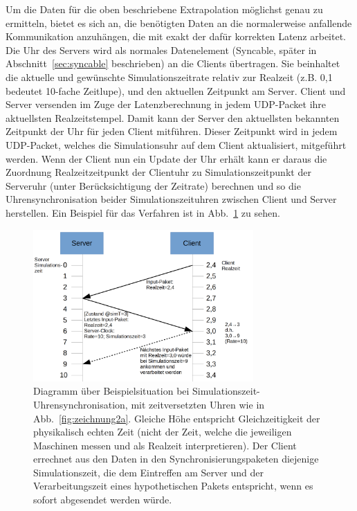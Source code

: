 Um die Daten für die oben beschriebene Extrapolation möglichst genau zu ermitteln, bietet es sich an, die benötigten Daten an die normalerweise anfallende Kommunikation anzuhängen, die mit exakt der dafür korrekten Latenz arbeitet. Die Uhr des Servers wird als normales Datenelement (Syncable, später in Abschnitt~\ref{sec:syncable} beschrieben) an die Clients übertragen. Sie beinhaltet die aktuelle und gewünschte Simulationszeitrate relativ zur Realzeit (z.B. 0,1 bedeutet 10-fache Zeitlupe), und den aktuellen Zeitpunkt am Server. 
Client und Server versenden im Zuge der Latenzberechnung in jedem UDP-Packet ihre aktuellsten Realzeitstempel. Damit kann der Server den aktuellsten bekannten Zeitpunkt der Uhr für jeden Client mitführen. 
Dieser Zeitpunkt wird in jedem UDP-Packet, welches die Simulationsuhr auf dem Client aktualisiert, mitgeführt werden.
Wenn der Client nun ein Update der Uhr erhält kann er daraus die Zuordnung Realzeitzeitpunkt der Clientuhr zu Simulationszeitpunkt der Serveruhr (unter Berücksichtigung der Zeitrate) berechnen und so die Uhrensynchronisation beider Simulationszeituhren zwischen Client und Server herstellen. Ein Beispiel für das Verfahren ist in Abb.~\ref{fig:zeichnung3a} zu sehen.
\begin{figure}
    \centering
    \includegraphics[width=0.75\textwidth]{./Zeichnung3a.png}
    \caption{Diagramm über Beispielsituation bei Simulationszeit-Uhrensynchronisation, mit zeitversetzten Uhren wie in Abb.~\ref{fig:zeichnung2a}. 
Gleiche Höhe entspricht Gleichzeitigkeit der physikalisch echten Zeit 
(nicht der Zeit, welche die jeweiligen Maschinen messen und als Realzeit interpretieren). Der Client errechnet aus den Daten in den Synchronisierungspaketen diejenige Simulationszeit, die dem Eintreffen am Server und der Verarbeitungszeit eines hypothetischen Pakets entspricht, wenn es sofort abgesendet werden würde.}
    \label{fig:zeichnung3a}
\end{figure}


